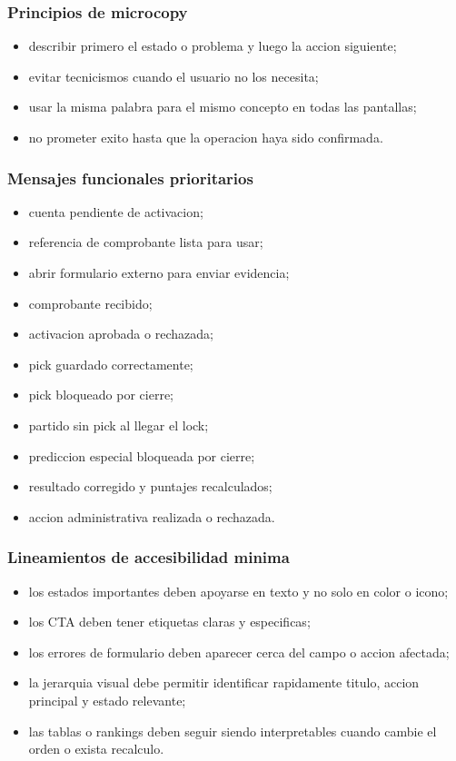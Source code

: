 \subsubsection{Principios de microcopy}

\begin{itemize}
  \item describir primero el estado o problema y luego la accion siguiente;
  \item evitar tecnicismos cuando el usuario no los necesita;
  \item usar la misma palabra para el mismo concepto en todas las pantallas;
  \item no prometer exito hasta que la operacion haya sido confirmada.
\end{itemize}

\subsubsection{Mensajes funcionales prioritarios}

\begin{itemize}
  \item cuenta pendiente de activacion;
  \item referencia de comprobante lista para usar;
  \item abrir formulario externo para enviar evidencia;
  \item comprobante recibido;
  \item activacion aprobada o rechazada;
  \item pick guardado correctamente;
  \item pick bloqueado por cierre;
  \item partido sin pick al llegar el lock;
  \item prediccion especial bloqueada por cierre;
  \item resultado corregido y puntajes recalculados;
  \item accion administrativa realizada o rechazada.
\end{itemize}

\subsubsection{Lineamientos de accesibilidad minima}

\begin{itemize}
  \item los estados importantes deben apoyarse en texto y no solo en color o icono;
  \item los CTA deben tener etiquetas claras y especificas;
  \item los errores de formulario deben aparecer cerca del campo o accion afectada;
  \item la jerarquia visual debe permitir identificar rapidamente titulo, accion principal y estado relevante;
  \item las tablas o rankings deben seguir siendo interpretables cuando cambie el orden o exista recalculo.
\end{itemize}

